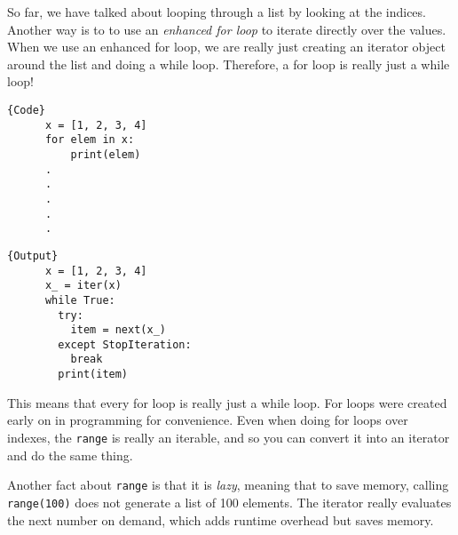 \documentclass{article}
\begin{document}
    So far, we have talked about looping through a list by looking at the indices. Another way is to to use an \textit{enhanced for loop} to iterate directly over the values. When we use an enhanced for loop, we are really just creating an iterator object around the list and doing a while loop. Therefore, a for loop is really just a while loop!  

    \noindent\begin{minipage}{.5\textwidth}
    \begin{lstlisting}[]{Code}
      x = [1, 2, 3, 4] 
      for elem in x: 
          print(elem)
      .
      .
      .
      .
      .
    \end{lstlisting}
    \end{minipage}
    \hfill
    \begin{minipage}{.49\textwidth}
    \begin{lstlisting}[]{Output}
      x = [1, 2, 3, 4] 
      x_ = iter(x) 
      while True: 
        try: 
          item = next(x_)
        except StopIteration: 
          break 
        print(item)
    \end{lstlisting}
    \end{minipage}

    This means that every for loop is really just a while loop. For loops were created early on in programming for convenience. Even when doing for loops over indexes, the \texttt{range} is really an iterable, and so you can convert it into an iterator and do the same thing. 

    Another fact about \texttt{range} is that it is \textit{lazy}, meaning that to save memory, calling \texttt{range(100)} does not generate a list of 100 elements. The iterator really evaluates the next number on demand, which adds runtime overhead but saves memory.   
\end{document}
